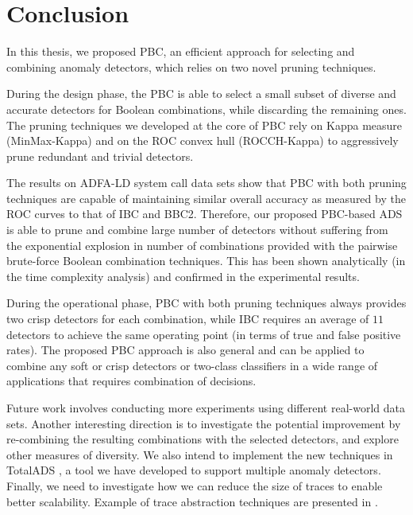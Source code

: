 \chapter{Conclusion} \label{chapter5}
In this thesis, we proposed PBC, an efficient approach for selecting and combining anomaly detectors, which relies on two novel pruning techniques.

During the design phase, the PBC is able to select a small subset of diverse and accurate detectors for Boolean combinations, while discarding the remaining ones.
The pruning techniques we developed at the core of PBC rely on Kappa measure (MinMax-Kappa) and on the ROC convex hull (ROCCH-Kappa) to aggressively prune redundant and trivial detectors.

The results on ADFA-LD system call data sets show that PBC with both pruning techniques are capable of maintaining similar overall accuracy as measured by the ROC curves to that of IBC and BBC2.
Therefore, our proposed PBC-based ADS is able to prune and combine large number of detectors without suffering from the exponential explosion in number of combinations provided with the pairwise brute-force Boolean combination techniques.
This has been shown analytically (in the time complexity analysis) and confirmed in the experimental results.

During the operational phase, PBC with both pruning techniques always provides two crisp detectors for each combination, while IBC requires an average of $11$ detectors to achieve the same operating point (in terms of true and false positive rates).
The proposed PBC approach is also general and can be applied to combine any soft or crisp detectors or two-class classifiers in a wide range of applications that requires combination of decisions.

Future work involves conducting more experiments using different real-world data sets.
Another interesting direction is to investigate the potential improvement by re-combining the resulting combinations with the selected detectors, and explore other measures of diversity. We also intend to implement the new techniques in TotalADS \cite{Murtaza2014}, a tool we have developed to support multiple anomaly detectors. Finally, we need to investigate how we can reduce the size of traces to enable better scalability. Example of trace abstraction techniques are presented in \cite{Hamou-Lhadj2005,Murtaza2013}.